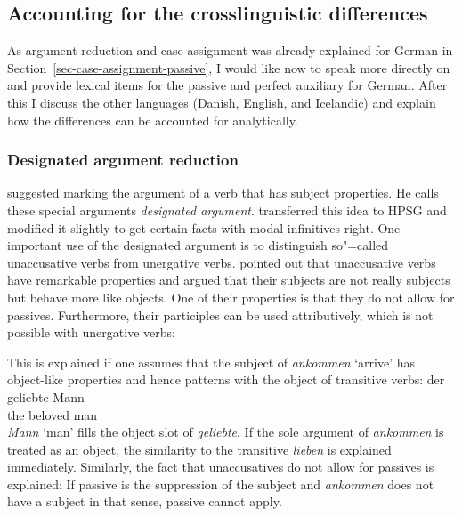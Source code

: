 




\subsection{Accounting for the crosslinguistic differences}

As argument reduction and case assignment was already explained for German in
Section~\ref{sec-case-assignment-passive}, I would like now to speak more directly on and provide 
lexical items for the passive and perfect auxiliary for German. After this I discuss the other
languages (\eg Danish, English, and Icelandic) and explain how the differences can be accounted for analytically.

\subsubsection{Designated argument reduction}

\largerpage
\citet[]{Haider86} suggested marking the argument of a verb that has subject properties. He calls
these special arguments \emph{designated argument}. \citet{HM94a} transferred this idea to HPSG and
\citet{Mueller2003e} modified it slightly to get certain facts with modal infinitives
right. One important use of the designated argument is to distinguish so"=called
unaccusative verbs from unergative verbs. \citet{Perlmutter78} pointed out that unaccusative verbs
have remarkable properties and argued that their subjects are not really subjects but behave more
like objects. One of their properties is that they do not allow for passives. Furthermore, their
participles can be used attributively, which is not possible with unergative verbs:

\eal
{}
\zl

\noindent
This is explained if one assumes that the subject of \emph{ankommen} `arrive' has object-like
properties and hence patterns with the object of transitive verbs:
\ea
\gll der geliebte Mann\\
     the beloved  man\\
\z
\emph{Mann} `man' fills the object slot of \emph{geliebte}. If the sole argument of \emph{ankommen}
is treated as an object, the similarity to the transitive \emph{lieben} is explained
immediately. Similarly, the fact that unaccusatives do not allow for passives is explained: If
passive is the suppression of the subject and \emph{ankommen} does not have a subject in that sense,
passive cannot apply.

